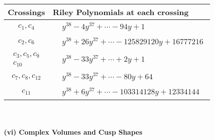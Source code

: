 \documentclass[1p]{elsarticle_modified}
\theoremstyle{definition}
\begin{document}
\begin{tabular}{m{50pt}|m{274pt}}
Crossings & \hspace{64pt}Riley Polynomials at each crossing \\
\hline $$\begin{aligned}c_{1},c_{4}\end{aligned}$$&$\begin{aligned}
&y^{38}-4 y^{37}+\cdots-94 y+1
\end{aligned}$\\
\hline $$\begin{aligned}c_{2},c_{6}\end{aligned}$$&$\begin{aligned}
&y^{38}+26 y^{37}+\cdots-125829120 y+16777216
\end{aligned}$\\
\hline $$\begin{aligned}c_{3},c_{5},c_{9}\\c_{10}\end{aligned}$$&$\begin{aligned}
&y^{38}-33 y^{37}+\cdots+2 y+1
\end{aligned}$\\
\hline $$\begin{aligned}c_{7},c_{8},c_{12}\end{aligned}$$&$\begin{aligned}
&y^{38}-33 y^{37}+\cdots-80 y+64
\end{aligned}$\\
\hline $$\begin{aligned}c_{11}\end{aligned}$$&$\begin{aligned}
&y^{38}+6 y^{37}+\cdots-103314128 y+12334144
\end{aligned}$\\
\hline
\end{tabular}\\~\\
\newpage\flushleft \textbf{(vi) Complex Volumes and Cusp Shapes}
\end{document}
